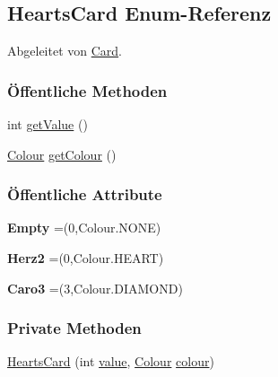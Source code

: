 \hypertarget{a00062}{\subsection{Hearts\-Card Enum-\/\-Referenz}
\label{a00062}
}


Abgeleitet von \hyperlink{a00054}{Card}.

\subsubsection*{Öffentliche Methoden}
\begin{DoxyCompactItemize}
\item 
int \hyperlink{a00062_aae714dc01fe7f5bb1a175d0d1068bb92}{get\-Value} ()
\item 
\hyperlink{a00058}{Colour} \hyperlink{a00062_abdfd7d21358d1587d6383603fa77037b}{get\-Colour} ()
\end{DoxyCompactItemize}
\subsubsection*{Öffentliche Attribute}
\begin{DoxyCompactItemize}
\item 
\hypertarget{a00062_ac3e3346bc6f9bb504e43495424c91a51}{{\bfseries Empty} =(0,Colour.\-N\-O\-N\-E)}\label{a00062_ac3e3346bc6f9bb504e43495424c91a51}

\item 
\hypertarget{a00062_acb64309250e89227af937dccd161d411}{{\bfseries Herz2} =(0,Colour.\-H\-E\-A\-R\-T)}\label{a00062_acb64309250e89227af937dccd161d411}

\item 
\hypertarget{a00062_a1b9939a1f08782417119c346eca0bbc0}{{\bfseries Caro3} =(3,Colour.\-D\-I\-A\-M\-O\-N\-D)}\label{a00062_a1b9939a1f08782417119c346eca0bbc0}

\end{DoxyCompactItemize}
\subsubsection*{Private Methoden}
\begin{DoxyCompactItemize}
\item 
\hyperlink{a00062_a9a284ee50821f42af48fb03d9055c12c}{Hearts\-Card} (int \hyperlink{a00062_a899c1b74df7f8fda2fcd2c85d9185da8}{value}, \hyperlink{a00058}{Colour} \hyperlink{a00062_ad8b08a076fe1a8affe777f3f33ed8d15}{colour})
\end{DoxyCompactItemize}
